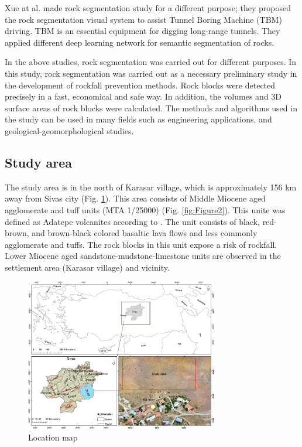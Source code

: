 \documentclass[a4paper,fleqn]{cas-sc}
\begin{document}
Xue at al. \citep{xue2021rock} made rock segmentation study for a different purpose; they proposed the rock segmentation visual system to assist Tunnel Boring Machine (TBM) driving. TBM is an essential equipment for digging long-range tunnels. They applied different deep learning network for semantic segmentation of rocks.

In the above studies, rock segmentation was carried out for different purposes. In this study, rock segmentation was carried out as a necessary preliminary study in the development of rockfall prevention methods. Rock blocks were detected precisely in a fast, economical and safe way. In addition, the volumes and 3D surface areas of rock blocks were calculated. The methods and algorithms used in the study can be used in many fields such as engineering applications, and geological-geomorphological studies.

\subsection{Study area}
The study area is in the north of Karasar village, which is approximately 156 km away from Sivas city (Fig. \ref{fig:Figure1}). This area consists of Middle Miocene aged agglomerate and tuff units (MTA 1/25000) (Fig. \ref{fig:Figure2}). This unite was defined as Adatepe volcanites according to \citep{yilmaz2004divriugi}. The unit consists of black, red-brown, and brown-black colored basaltic lava flows and less commonly agglomerate and tuffs. The rock blocks in this unit expose a risk of rockfall. Lower Miocene aged sandstone-mudstone-limestone units are observed in the settlement area (Karasar village) and vicinity.
\begin{figure}
	\centering
	\includegraphics[width=0.75\textwidth]{figures/fig1.jpg}
	\caption{ Location map}
	\label{fig:Figure1}
\end{figure}
\end{document}
